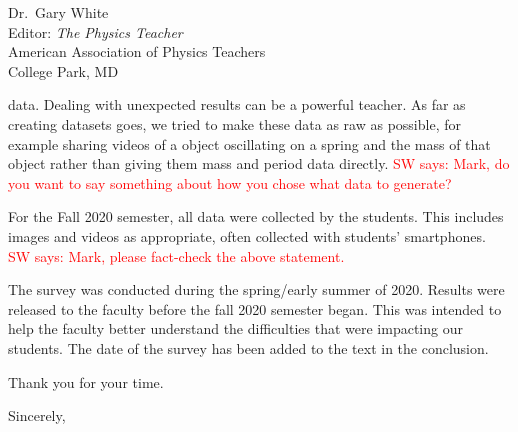 \documentclass{letter}
\makeatletter
\renewcommand{\closing}[1]{\par\nobreak\vspace{\parskip}%
  \stopbreaks
  \noindent
  \ifx\@empty\fromaddress\else
  \hspace*{\longindentation}\fi
  \parbox{\indentedwidth}{\raggedright
       \ignorespaces #1\\[2\medskipamount]%
       \ifx\@empty\fromsig
           \fromname
       \else \fromsig \fi\strut}%
   \par}
\newcommand{\swsays}[1]{\textcolor{red}{SW says: #1}}
\makeatother
\begin{document}
\begin{letter}{Dr.\ Gary White \\ Editor: \textit{The Physics Teacher} \\ American Association
    of Physics Teachers \\ College Park, MD}
\begin{description}
    data. Dealing with unexpected results can be a powerful teacher. As far as creating
    datasets goes, we tried to make these data as raw as possible, for example sharing videos
    of a object oscillating on a spring and the mass of that object rather than giving them
    mass and period data directly. \swsays{Mark, do you want to say something about how you
      chose what data to generate?}
    \item[Details about Fall 2020] For the Fall 2020 semester, all data were collected by the
    students.  This includes images and videos as appropriate, often collected with students'
    smartphones. \swsays{Mark, please fact-check the above statement.}
    \item[Details about the survey] The survey was conducted during the spring/early summer of
    2020.  Results were released to the faculty before the fall 2020 semester began.  This was
    intended to help the faculty better understand the difficulties that were impacting our
    students. The date of the survey has been added to the text in the conclusion.
  \end{description}

  Thank you for your time.
  
  \closing{Sincerely,}
    
\end{letter}
\end{document}
